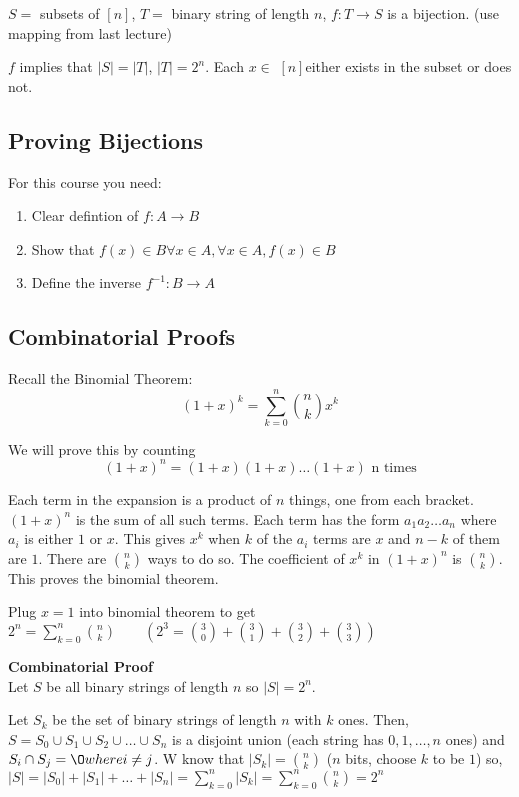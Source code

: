 \documentclass{article}
\newcommand{\setn}{$[n]$}
\newcommand{\oto}[1]{$[#1]$}
\newcommand{\func}[3][f]{$#1: #2 \rightarrow #3$}
\newcommand{\intersect}{\cap}
\newcommand{\union}{\cup}
\begin{document}
$S = $ subsets of \oto{n}, $T = $ binary string of length $n$, \func{T}{S} is a bijection. (use mapping from last lecture)

$f$ implies that $|S|=|T|$, $|T| = 2^n$. Each $x \in $ \setn either exists in the subset or does not.

\subsection{Proving Bijections}
For this course you need:
\begin{enumerate}
	\item Clear defintion of \func{A}{B}
	\item Show that $f(x) \in B \forall x \in A, \forall x \in A, f(x) \in B$
	\item Define the inverse \func[f^{-1}]{B}{A}
\end{enumerate}

\subsection{Combinatorial Proofs}
Recall the Binomial Theorem:
$$(1+x)^k = \sum_{k=0}^{n} \binom nk x^k$$

We will prove this by counting
$$(1+x)^n = (1+x)(1+x) \dots (1+x) \text{ n times}$$

Each term in the expansion is a product of $n$ things, one from each bracket. $(1+x)^n$ is the sum of all such terms. Each term has the form $a_1a_2 \dots a_n$ where $a_i$ is either $1$ or $x$. This gives $x^k$ when $k$ of the $a_i$ terms are $x$ and $n-k$ of them are $1$. There are $\binom nk$ ways to do so. The coefficient of $x^k$ in $(1+x)^n$ is $\binom nk$. This proves the binomial theorem.

\example
Plug $x=1$ into binomial theorem to get $2^n = \sum_{k=0}^{n} \binom nk \qquad (2^3 = \binom 30 + \binom 31 + \binom 32 + \binom 33 )$

\textbf{Combinatorial Proof\\}
Let $S$ be all binary strings of length $n$ so $|S| = 2^n$.

Let $S_k$ be the set of binary strings of length $n$ with $k$ ones. Then, $S = S_0 \union S_1 \union S_2 \union \dots \union S_n$ is a disjoint union (each string has $0,1, \dots , n$ ones) and $S_i \intersect S_j = \O where i \neq j$. W know that $|S_k| = \binom nk$ ($n$ bits, choose $k$ to be $1$) so, $|S| = |S_0| + |S_1| + \dots + |S_n| = \sum_{k=0}^{n} |S_k| = \sum_{k=0}^{n} \binom nk = 2^n$
\end{document}

